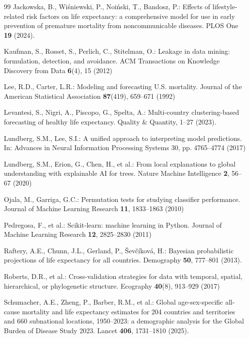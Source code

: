 \documentclass[runningheads]{llncs}
\begin{document}
\begin{thebibliography}{99}
Jackowska, B., Wiśniewski, P., Noiński, T., Bandosz, P.: Effects of lifestyle-related risk factors
on life expectancy: a comprehensive model for use in early prevention of premature mortality from
noncommunicable diseases. PLOS One \textbf{19} (2024). 

Kaufman, S., Rosset, S., Perlich, C., Stitelman, O.: Leakage in data mining: formulation,
detection, and avoidance. ACM Transactions on Knowledge Discovery from Data \textbf{6}(4), 15 (2012)

Lee, R.D., Carter, L.R.: Modeling and forecasting U.S. mortality. Journal of the American
Statistical Association \textbf{87}(419), 659--671 (1992)

Levantesi, S., Nigri, A., Piscopo, G., Spelta, A.: Multi-country clustering-based forecasting of
healthy life expectancy. Quality \& Quantity, 1--27 (2023). 

Lundberg, S.M., Lee, S.I.: A unified approach to interpreting model predictions. In: Advances in
Neural Information Processing Systems 30, pp. 4765--4774 (2017)

Lundberg, S.M., Erion, G., Chen, H., et al.: From local explanations to global understanding with
explainable AI for trees. Nature Machine Intelligence \textbf{2}, 56--67 (2020)

Ojala, M., Garriga, G.C.: Permutation tests for studying classifier performance. Journal of
Machine Learning Research \textbf{11}, 1833--1863 (2010)

Pedregosa, F., et al.: Scikit-learn: machine learning in Python. Journal of Machine Learning
Research \textbf{12}, 2825--2830 (2011)

Raftery, A.E., Chunn, J.L., Gerland, P., Ševčíková, H.: Bayesian probabilistic projections of
life expectancy for all countries. Demography \textbf{50}, 777--801 (2013).

Roberts, D.R., et al.: Cross-validation strategies for data with temporal, spatial, hierarchical,
or phylogenetic structure. Ecography \textbf{40}(8), 913--929 (2017)

Schumacher, A.E., Zheng, P., Barber, R.M., et al.: Global age-sex-specific all-cause mortality and
life expectancy estimates for 204 countries and territories and 660 subnational locations,
1950--2023: a demographic analysis for the Global Burden of Disease Study 2023. Lancet
\textbf{406}, 1731--1810 (2025). 


\end{thebibliography}
\end{document}
